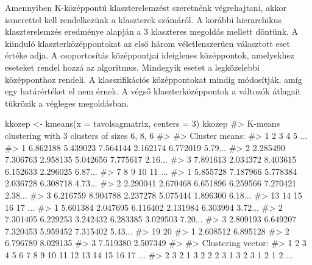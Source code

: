 \documentclass[
  letterpaper,
]{krantz}
\makeatletter
\newenvironment{Shaded}{\begin{snugshade}}{\end{snugshade}}
\newcommand{\AttributeTok}[1]{\textcolor[rgb]{0.40,0.45,0.13}{#1}}
\newcommand{\CommentTok}[1]{\textcolor[rgb]{0.37,0.37,0.37}{#1}}
\newcommand{\DecValTok}[1]{\textcolor[rgb]{0.68,0.00,0.00}{#1}}
\newcommand{\FunctionTok}[1]{\textcolor[rgb]{0.28,0.35,0.67}{#1}}
\newcommand{\NormalTok}[1]{\textcolor[rgb]{0.00,0.23,0.31}{#1}}
\newcommand{\OtherTok}[1]{\textcolor[rgb]{0.00,0.23,0.31}{#1}}
\newenvironment{kframe}{%
\medskip{}
\setlength{\fboxsep}{.8em}
 \def\at@end@of@kframe{}%
 \ifinner\ifhmode%
  \def\at@end@of@kframe{\end{minipage}}%
  \begin{minipage}{\columnwidth}%
 \fi\fi%
 \def\FrameCommand##1{\hskip\@totalleftmargin \hskip-\fboxsep
 \colorbox{shadecolor}{##1}\hskip-\fboxsep
     \hskip-\linewidth \hskip-\@totalleftmargin \hskip\columnwidth}%
 \MakeFramed {\advance\hsize-\width
   \@totalleftmargin\z@ \linewidth\hsize
   \@setminipage}}%
 {\par\unskip\endMakeFramed%
 \at@end@of@kframe}
\renewenvironment{Shaded}{\begin{kframe}}{\end{kframe}}
\makeatother
\begin{document}
Amennyiben K-középpontú klaszterelemzést szeretnénk végrehajtani, akkor
ismerettel kell rendelkezünk a klaszterek számáról. A korábbi
hierarchikus klaszterelemzés eredménye alapján a 3 klaszteres megoldás
mellett döntünk. A kiinduló klaszterközéppontokat az első három
véletlenszerűen választott eset értéke adja. A csoportosítás
középpontjai ideiglenes középpontok, amelyekhez eseteket rendel hozzá az
algoritmus. Mindegyik esetet a legközelebbi középponthoz rendeli. A
klasszifikációs középpontokat mindig módosítják, amíg egy határértéket
el nem érnek. A végső klaszterközéppontok a változók átlagait tükrözik a
végleges megoldásban.

\begin{Shaded}
\begin{Highlighting}[]
\NormalTok{kkozep }\OtherTok{\textless{}{-}} \FunctionTok{kmeans}\NormalTok{(}\AttributeTok{x =}\NormalTok{ tavolsagmatrix, }\AttributeTok{centers =} \DecValTok{3}\NormalTok{)}
\NormalTok{kkozep}
\CommentTok{\#\textgreater{} K{-}means clustering with 3 clusters of sizes 6, 8, 6}
\CommentTok{\#\textgreater{} }
\CommentTok{\#\textgreater{} Cluster means:}
\CommentTok{\#\textgreater{}          1        2        3        4        5     ...}
\CommentTok{\#\textgreater{} 1 6.862188 5.439023 7.564144 2.162174 6.772019 5.79...}
\CommentTok{\#\textgreater{} 2 2.285490 7.306763 2.958135 5.042656 7.775617 2.16...}
\CommentTok{\#\textgreater{} 3 7.891613 2.034372 8.403615 6.152633 2.296025 6.87...}
\CommentTok{\#\textgreater{}          7        8        9       10       11     ...}
\CommentTok{\#\textgreater{} 1 5.855728 7.187966 5.778384 2.036728 6.308718 4.73...}
\CommentTok{\#\textgreater{} 2 2.290041 2.670468 6.651896 6.259566 7.270421 2.38...}
\CommentTok{\#\textgreater{} 3 6.216759 8.904788 2.237278 5.075444 1.896300 6.18...}
\CommentTok{\#\textgreater{}         13       14       15       16       17     ...}
\CommentTok{\#\textgreater{} 1 5.601384 2.047695 6.116402 2.131984 6.303994 3.72...}
\CommentTok{\#\textgreater{} 2 7.301405 6.229253 3.242432 6.283385 3.029503 7.20...}
\CommentTok{\#\textgreater{} 3 2.809193 6.649207 7.320453 5.959452 7.315402 5.43...}
\CommentTok{\#\textgreater{}         19       20}
\CommentTok{\#\textgreater{} 1 2.608512 6.895128}
\CommentTok{\#\textgreater{} 2 6.796789 8.029135}
\CommentTok{\#\textgreater{} 3 7.519380 2.507349}
\CommentTok{\#\textgreater{} }
\CommentTok{\#\textgreater{} Clustering vector:}
\CommentTok{\#\textgreater{}  1  2  3  4  5  6  7  8  9 10 11 12 13 14 15 16 17 ...}
\CommentTok{\#\textgreater{}  2  3  2  1  3  2  2  2  3  1  3  2  3  1  2  1  2 ...}

\end{Highlighting}
\end{Shaded}
\end{document}
